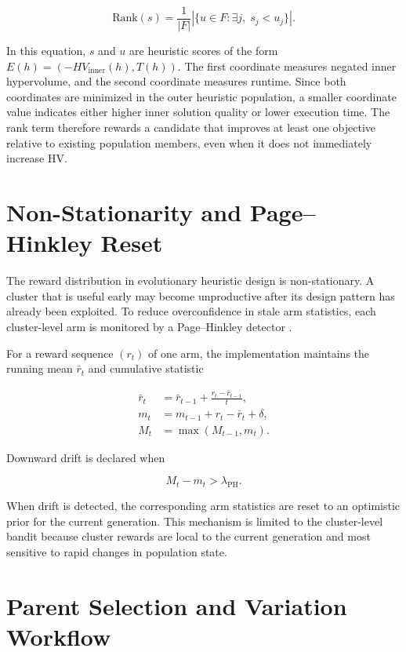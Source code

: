 \documentclass[../main.tex]{subfiles}
\begin{document}
\begin{equation}
  \mathrm{Rank}(s)
  =
  \frac{1}{|F|}
  \left|\{u \in F : \exists j,\; s_j < u_j\}\right|.
\end{equation}

In this equation, $s$ and $u$ are heuristic scores of the form $E(h)=(-HV_{\text{inner}}(h),T(h))$. The first coordinate measures negated inner hypervolume, and the second coordinate measures runtime. Since both coordinates are minimized in the outer heuristic population, a smaller coordinate value indicates either higher inner solution quality or lower execution time. The rank term therefore rewards a candidate that improves at least one objective relative to existing population members, even when it does not immediately increase HV.

\section{Non-Stationarity and Page--Hinkley Reset}

The reward distribution in evolutionary heuristic design is non-stationary. A cluster that is useful early may become unproductive after its design pattern has already been exploited. To reduce overconfidence in stale arm statistics, each cluster-level arm is monitored by a Page--Hinkley detector \cite{page1954continuous}.

For a reward sequence $(r_t)$ of one arm, the implementation maintains the running mean $\bar{r}_t$ and cumulative statistic

\begin{align}
  \bar{r}_t &= \bar{r}_{t-1} + \frac{r_t-\bar{r}_{t-1}}{t}, \\
  m_t &= m_{t-1}+r_t-\bar{r}_t+\delta, \\
  M_t &= \max(M_{t-1},m_t).
\end{align}

Downward drift is declared when

\begin{equation}
  M_t - m_t > \lambda_{\mathrm{PH}}.
\end{equation}

When drift is detected, the corresponding arm statistics are reset to an optimistic prior for the current generation. This mechanism is limited to the cluster-level bandit because cluster rewards are local to the current generation and most sensitive to rapid changes in population state.

\section{Parent Selection and Variation Workflow}
\end{document}
